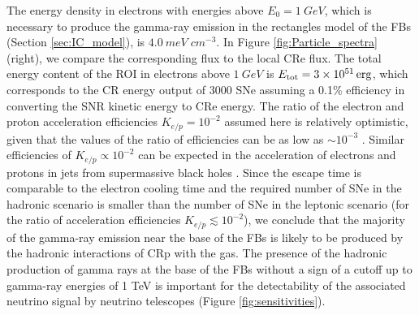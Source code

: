The energy density in electrons with energies above $E_0 = \SI{1}{GeV}$, which is necessary to produce the gamma-ray emission
in the rectangles model of the FBs (Section \ref{sec:IC_model}), is $\SI{4.0}{meV\;cm^{-3}}$.
In Figure \ref{fig:Particle_spectra} (right), we compare the corresponding flux to the local CRe flux.
The total energy content of the ROI in electrons above $\SI{1}{GeV}$ is $E_{\text{tot}} = \SI{3e51}{erg}$, which corresponds to the CR energy output of 3000 SNe 
assuming a 0.1\% efficiency in converting the SNR kinetic energy to CRe energy.
The ratio of the electron and proton acceleration efficiencies $K_{e/p} = 10^{-2}$ assumed here is relatively optimistic,
given that the values of the ratio of efficiencies can be as low as $\sim 10^{-3}$ \citep[e.g.,][]{2015PhRvL.114h5003P}.
Similar efficiencies of $K_{e/p} \propto 10^{-2}$ can be expected in the acceleration of 
electrons and protons in jets from supermassive black holes \citep[e.g.,][]{2018arXiv180305556B}.
Since the escape time is comparable to the electron cooling time and the required number of SNe in the hadronic
scenario is smaller than the number of SNe in the leptonic scenario (for the ratio of acceleration efficiencies $K_{e/p} \lesssim 10^{-2}$),
we conclude that the majority of the gamma-ray emission near the base of the FBs 
is likely to be produced by the hadronic interactions of CRp with the gas.
The presence of the hadronic production of gamma rays at the base of the FBs without a sign of a cutoff up to gamma-ray energies
of 1 TeV is important for the detectability of the associated neutrino signal by neutrino telescopes (Figure \ref{fig:sensitivities}).

